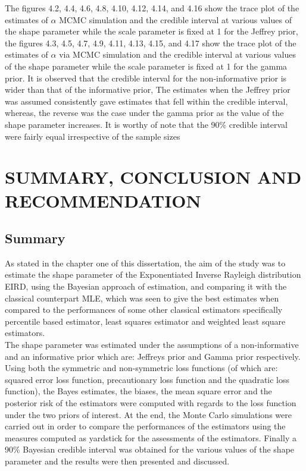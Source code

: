 \documentclass[a4paper,12pt]{report}
\newcommand{\para}{\hspace{0.5cm}}
\begin{document}
{\indent The figures 4.2, 4.4, 4.6, 4.8, 4.10, 4.12, 4.14, and 4.16 show the trace plot of the estimates of $\alpha$ MCMC simulation and the credible interval at various values of the shape parameter while the scale parameter is fixed at 1 for the Jeffrey prior, the figures 4.3, 4.5, 4.7, 4.9, 4.11, 4.13, 4.15, and 4.17 show the trace plot of the estimates of $\alpha$ via MCMC simulation and the credible interval at various values of the shape parameter while the scale parameter is fixed at 1 for the gamma prior. It is observed that the credible interval for the non-informative prior is wider than that of the informative prior, The estimates when the Jeffrey prior was assumed consistently gave estimates that fell within the credible interval, whereas, the reverse was the case under the gamma prior as the value of the shape parameter increases. It is worthy of note that the 90\% credible interval were fairly equal irrespective of the sample sizes

\clearpage
\restoregeometry


\newpage
\chapter{SUMMARY, CONCLUSION AND RECOMMENDATION}

\section{Summary}

\noindent\para As stated in the chapter one of this dissertation, the aim of the study was to estimate the shape parameter of the Exponentiated Inverse Rayleigh distribution EIRD, using the Bayesian approach of estimation, and comparing it with the classical counterpart MLE, which was seen to give the best estimates when compared to the performances of some other classical estimators specifically percentile based estimator, least squares estimator and weighted least square estimators.\\
\indent The shape parameter was estimated under the assumptions of a non-informative and an informative prior which are: Jeffreys prior and Gamma prior respectively. Using both the symmetric and non-symmetric loss functions (of which are: squared error loss function, precautionary loss function and the quadratic loss function), the Bayes estimates, the biases, the mean square error and the posterior risk of the estimators were computed with regards to the loss function under the two priors of interest. At the end, the Monte Carlo simulations were carried out in order to compare the performances of the estimators using the measures computed as yardstick for the assessments of the estimators. Finally a 90\% Bayesian credible interval was obtained for the various values of the shape parameter and the results were then presented and discussed.  
}
\end{document}
